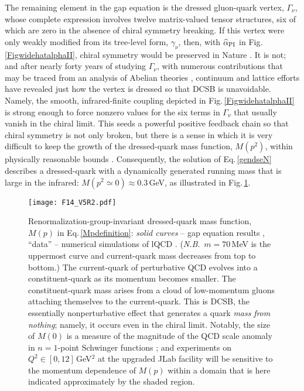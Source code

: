 The remaining element in the gap equation is the dressed gluon-quark vertex, $\Gamma_\nu$, whose complete expression involves twelve matrix-valued tensor structures, six of which are zero in the absence of chiral symmetry breaking.  If this vertex were only weakly modified from its tree-level form, $\gamma_\nu$, then, with $\widehat{\alpha}_{\rm PI}$ in Fig.\,\ref{FigwidehatalphaII}, chiral symmetry would be preserved in Nature \cite{Binosi:2016wcx}.  It is not; and after nearly forty years of studying $\Gamma_\nu$, with numerous contributions that may be traced from an analysis of Abelian theories \cite{Ball:1980ay}, continuum and lattice efforts have revealed just how the vertex is dressed so that DCSB is unavoidable.  Namely, the smooth, infrared-finite coupling depicted in Fig.\,\ref{FigwidehatalphaII} is strong enough to force nonzero values for the six terms in $\Gamma_\nu$ that usually vanish in the chiral limit.  This seeds a powerful positive feedback chain so that chiral symmetry is not only broken, but there is a sense in which it is very difficult to keep the growth of the dressed-quark mass function, $M(p^2)$, within physically reasonable bounds \cite{Binosi:2016wcx}.  Consequently, the solution of Eq.\,\eqref{gendseN} describes a dressed-quark with a dynamically generated running mass that is large in the infrared: $M(p^2 \simeq 0) \approx 0.3\,$GeV, as illustrated in Fig.\,\ref{gluoncloud}.

\begin{figure}[t]
\centerline{\texttt{[image: F14\_V5R2.pdf]}}
\caption{\label{gluoncloud}
Renormalization-group-invariant dressed-quark mass function, $M(p)$ in Eq.\,\eqref{Mpdefinition}: \emph{solid curves} -- gap equation results \cite{Bhagwat:2003vw,Bhagwat:2006tu}, ``data'' -- numerical simulations of lQCD \protect\cite{Bowman:2005vx}.  (\emph{N.B}.\ $m=70\,$MeV is the uppermost curve and current-quark mass decreases from top to bottom.)  The current-quark of perturbative QCD evolves into a constituent-quark as its momentum becomes smaller.  The constituent-quark mass arises from a cloud of low-momentum gluons attaching themselves to the current-quark.  This is DCSB, the essentially nonperturbative effect that generates a quark \emph{mass} \emph{from nothing}; namely, it occurs even in the chiral limit.
%
Notably, the size of $M(0)$ is a measure of the magnitude of the QCD scale anomaly in $n=1$-point Schwinger functions \cite{Roberts:2016vyn};
%
and experiments on $Q^2\in [0,12]\,$GeV$^2$ at the upgraded JLab facility will be sensitive to the momentum dependence of $M(p)$ within a domain that is here indicated approximately by the shaded region.
}
\end{figure}

